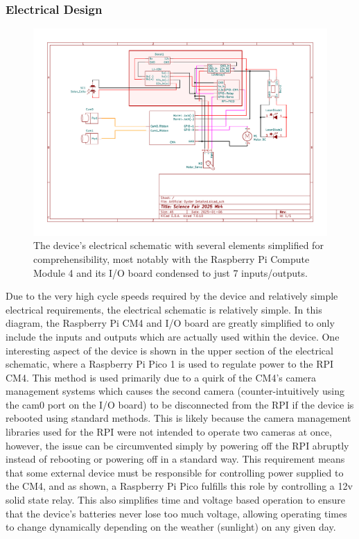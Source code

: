 \documentclass[fleqn,10pt]{SelfArx} %
\begin{document}
	\subsubsection{Electrical Design}
	\begin{figure}[h]
		\centering
		\includegraphics[width=1\linewidth]{Figures/ElecSchematic}
		\caption[Electrical Schematic]{The device's electrical schematic with several elements simplified for comprehensibility, most notably with the Raspberry Pi Compute Module 4 and its I/O board condensed to just 7 inputs/outputs.}
		\label{fig:ElecSchem}
	\end{figure}
	
	Due to the very high cycle speeds required by the device and relatively simple electrical requirements, the electrical schematic is relatively simple. In this diagram, the Raspberry Pi CM4 and I/O board are greatly simplified to only include the inputs and outputs which are actually used within the device. One interesting aspect of the device is shown in the upper section of the electrical schematic, where a Raspberry Pi Pico 1 is used to regulate power to the RPI CM4. This method is used primarily due to a quirk of the CM4’s camera management systems which causes the second camera (counter-intuitively using the cam0 port on the I/O board) to be disconnected from the RPI if the device is rebooted using standard methods. This is likely because the camera management libraries used for the RPI were not intended to operate two cameras at once, however, the issue can be circumvented simply by powering off the RPI abruptly instead of rebooting or powering off in a standard way. This requirement means that some external device must be responsible for controlling power supplied to the CM4, and as shown, a Raspberry Pi Pico fulfills this role by controlling a 12v solid state relay. This also simplifies time and voltage based operation to ensure that the device’s batteries never lose too much voltage, allowing operating times to change dynamically depending on the weather (sunlight) on any given day. 
\end{document}
